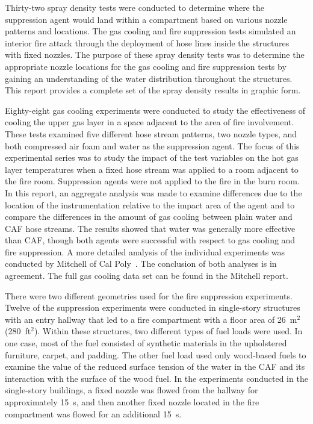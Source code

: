 \documentclass[12pt,oneside]{book}
\begin{document}
Thirty-two spray density tests were conducted to determine where the suppression agent would land within a compartment based on various nozzle patterns and locations. The gas cooling and fire suppression tests simulated an interior fire attack through the deployment of hose lines inside the structures with fixed nozzles. The purpose of these spray density tests was to determine the appropriate nozzle locations for the gas cooling and fire suppression tests by gaining an understanding of the water distribution throughout the structures. This report provides a complete set of the spray density results in graphic form.

Eighty-eight gas cooling experiments were conducted to study the effectiveness of cooling the upper gas layer in a space adjacent to the area of fire involvement. These tests examined five different hose stream patterns, two nozzle types, and both compressed air foam and water as the suppression agent. The focus of this experimental series was to study the impact of the test variables on the hot gas layer temperatures when a fixed hose stream was applied to a room adjacent to the fire room. Suppression agents were not applied to the fire in the burn room. In this report, an aggregate analysis was made to examine differences due to the location of the instrumentation relative to the impact area of the agent and to compare the differences in the amount of gas cooling between plain water and CAF hose streams. The results showed that water was generally more effective than CAF, though both agents were successful with respect to gas cooling and fire suppression. A more detailed analysis of the individual experiments was conducted by Mitchell of Cal Poly~\cite{Mitchell:1}. The conclusion of both analyses is in agreement. The full gas cooling data set can be found in the Mitchell report.    

There were two different geometries used for the fire suppression experiments. Twelve of the suppression experiments were conducted in single-story structures with an entry hallway that led to a fire compartment with a floor area of 26~m$^2$ (280~ft$^2$). Within these structures, two different types of fuel loads were used. In one case, most of the fuel consisted of synthetic materials in the upholstered furniture, carpet, and padding. The other fuel load used only wood-based fuels to examine the value of the reduced surface tension of the water in the CAF and its interaction with the surface of the wood fuel. In the experiments conducted in the single-story buildings, a fixed nozzle was flowed from the hallway for approximately 15~s, and then another fixed nozzle located in the fire compartment was flowed for an additional 15~s.   
\end{document}
